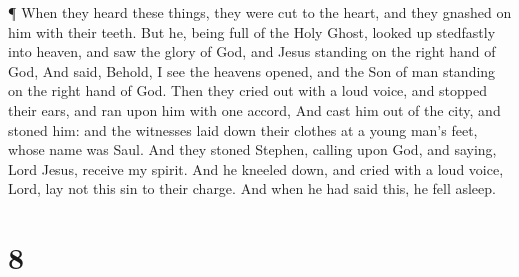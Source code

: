  ¶ When they heard these things, they were cut to the
heart, and they gnashed on him with their teeth.  But he,
being full of the Holy Ghost, looked up stedfastly into heaven, and saw
the glory of God, and Jesus standing on the right hand of God,
 And said, Behold, I see the heavens opened, and the Son of
man standing on the right hand of God.  Then they cried out
with a loud voice, and stopped their ears, and ran upon him with one
accord,  And cast him out of the city, and stoned him: and
the witnesses laid down their clothes at a young man's feet, whose name
was Saul.  And they stoned Stephen, calling upon God, and
saying, Lord Jesus, receive my spirit.  And he kneeled
down, and cried with a loud voice, Lord, lay not this sin to their
charge. And when he had said this, he fell asleep.

\hypertarget{section-7}{%
\section{8}\label{section-7}}

